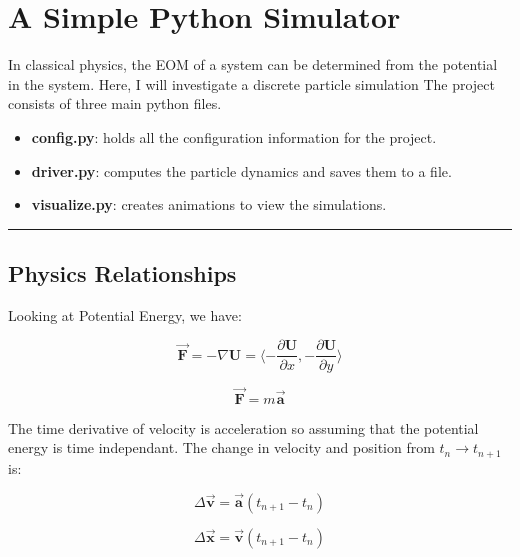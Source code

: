 \documentclass{article}
\begin{document}
\section*{A Simple Python Simulator}
    In classical physics, the EOM of a system can be determined from the potential in the system.
    Here, I will investigate a discrete particle simulation
    The project consists of three main python files.
    \begin{itemize}
        \item \textbf{config.py}: holds all the configuration information for the project.
        \item \textbf{driver.py}: computes the particle dynamics and saves them to a file.
        \item \textbf{visualize.py}: creates animations to view the simulations.
    \end{itemize}  

\vspace{5pt}
\hrule
\vspace{5pt}

\subsection*{Physics Relationships}

Looking at Potential Energy, we have:

\begin{equation}
       \overrightarrow{\mathbf{F}} = -\nabla \mathbf{U} = \langle -\frac{\partial \mathbf{U}}{\partial x}, -\frac{\partial \mathbf{U}}{\partial y} \rangle
\end{equation}

\begin{equation}
    \overrightarrow{\mathbf{F}} = m\overrightarrow{\mathbf{a}}
\end{equation}

\noindent The time derivative of velocity is acceleration so assuming that the potential energy is time independant.
The change in velocity and position from $t_n \rightarrow t_{n+1}$ is:

\begin{equation}
    \Delta \overrightarrow{\mathbf{v}} = \overrightarrow{\mathbf{a}} (t_{n+1} - t_{n})
\end{equation}

\begin{equation}
    \Delta \overrightarrow{\mathbf{x}} = \overrightarrow{\mathbf{v}} (t_{n+1} - t_{n})
\end{equation}
\end{document}
